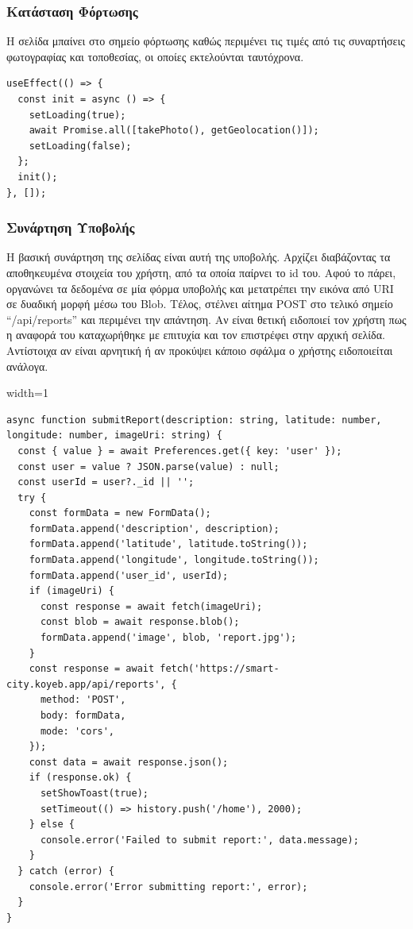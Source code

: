 \subsubsection*{Κατάσταση Φόρτωσης}
Η σελίδα μπαίνει στο σημείο φόρτωσης καθώς περιμένει τις τιμές από τις συναρτήσεις φωτογραφίας και τοποθεσίας, οι οποίες εκτελούνται ταυτόχρονα.
\\
\begin{lstlisting}
useEffect(() => {
  const init = async () => {
    setLoading(true);
    await Promise.all([takePhoto(), getGeolocation()]);
    setLoading(false);
  };
  init();
}, []);
\end{lstlisting}

\subsubsection*{Συνάρτηση Υποβολής}
Η βασική συνάρτηση της σελίδας είναι αυτή της υποβολής. Αρχίζει διαβάζοντας τα αποθηκευμένα στοιχεία του χρήστη, από τα οποία παίρνει το id του. Αφού το πάρει, οργανώνει τα δεδομένα σε μία φόρμα υποβολής και μετατρέπει την εικόνα από URI σε δυαδική μορφή μέσω του Βlob. Τέλος, στέλνει αίτημα POST στο τελικό σημείο “/api/reports” και περιμένει την απάντηση. Αν είναι θετική ειδοποιεί τον χρήστη πως η αναφορά του καταχωρήθηκε με επιτυχία και τον επιστρέφει στην αρχική σελίδα. Αντίστοιχα αν είναι αρνητική ή αν προκύψει κάποιο σφάλμα ο χρήστης ειδοποιείται ανάλογα.
\\
\begin{adjustbox}{width=1\textwidth}\begin{lstlisting}
async function submitReport(description: string, latitude: number, longitude: number, imageUri: string) {
  const { value } = await Preferences.get({ key: 'user' });
  const user = value ? JSON.parse(value) : null;
  const userId = user?._id || '';
  try {
    const formData = new FormData();
    formData.append('description', description);
    formData.append('latitude', latitude.toString());
    formData.append('longitude', longitude.toString());
    formData.append('user_id', userId);
    if (imageUri) {
      const response = await fetch(imageUri);
      const blob = await response.blob();
      formData.append('image', blob, 'report.jpg');
    }
    const response = await fetch('https://smart-city.koyeb.app/api/reports', {
      method: 'POST',
      body: formData,
      mode: 'cors',
    });
    const data = await response.json();
    if (response.ok) {
      setShowToast(true);
      setTimeout(() => history.push('/home'), 2000);
    } else {
      console.error('Failed to submit report:', data.message);
    }
  } catch (error) {
    console.error('Error submitting report:', error);
  }
}
\end{lstlisting}\end{adjustbox}
\newline


